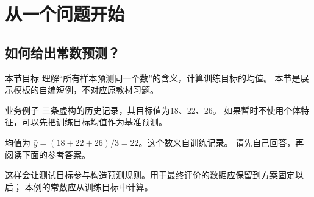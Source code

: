 \section{从一个问题开始}
\subsection{如何给出常数预测？}
\begin{redbox}{本节目标}
理解“所有样本预测同一个数”的含义，计算训练目标的均值。
本节是展示模板的自编短例，不对应原教材习题。
\end{redbox}
\begin{examplebox}{业务例子}
三条虚构的历史记录，其目标值为18、22、26。
如果暂时不使用个体特征，可以先把训练目标均值作为基准预测。
\end{examplebox}
均值为 $\bar y=(18+22+26)/3=22$。这个数来自训练记录。
请先自己回答，再阅读下面的参考答案。
\begin{answerbox}
这样会让测试目标参与构造预测规则。用于最终评价的数据应保留到方案固定以后；
本例的常数应从训练目标中计算。
\end{answerbox}
